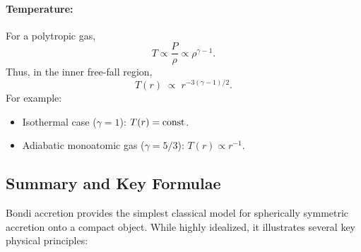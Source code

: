 \paragraph{Temperature:} For a polytropic gas,
\[
T \propto \frac{P}{\rho} \propto \rho^{\gamma-1}.
\]
Thus, in the inner free-fall region,
\[
T(r) \;\propto\; r^{-3(\gamma-1)/2}.
\]
For example:
\begin{itemize}
    \item Isothermal case ($\gamma=1$): $T(r) = \rm{const}$.  
    \item Adiabatic monoatomic gas ($\gamma=5/3$): $T(r) \propto r^{-1}$.
\end{itemize}


\subsection*{Summary and Key Formulae}

Bondi accretion provides the simplest classical model for spherically symmetric accretion onto a compact object. While highly idealized, it illustrates several key physical principles:

